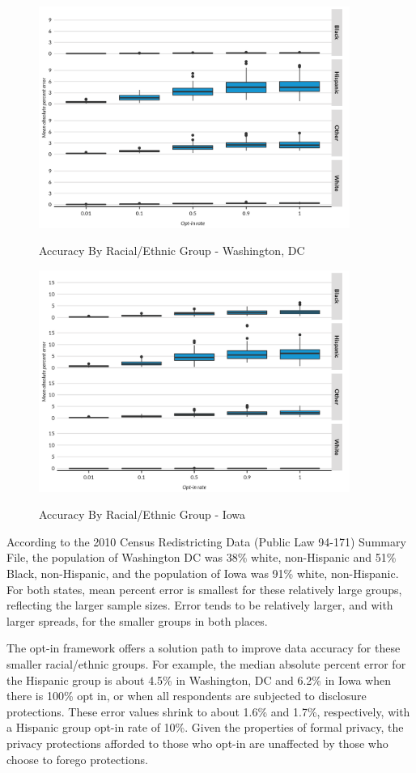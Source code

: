 \documentclass[
]{urban-formatting}
\begin{document}
\begin{figure}[!htb]
    \centering
    \caption{Accuracy By Racial/Ethnic Group - Washington, DC}
    \includegraphics[width=4in]{../figures/groups_dc.png}
    \label{fig:groups_dc}
\end{figure}

\begin{figure}[!htb]
    \centering
    \caption{Accuracy By Racial/Ethnic Group - Iowa}
    \includegraphics[width=4in]{../figures/groups_ia.png}
    \label{fig:groups_ia}
\end{figure}

According to the 2010 Census Redistricting Data (Public Law 94-171)
Summary File, the population of Washington DC was 38\% white,
non-Hispanic and 51\% Black, non-Hispanic, and the population of Iowa
was 91\% white, non-Hispanic. For both states, mean percent error is
smallest for these relatively large groups, reflecting the larger sample
sizes. Error tends to be relatively larger, and with larger spreads, for
the smaller groups in both places.

The opt-in framework offers a solution path to improve data accuracy for
these smaller racial/ethnic groups. For example, the median absolute
percent error for the Hispanic group is about 4.5\% in Washington, DC
and 6.2\% in Iowa when there is 100\% opt in, or when all respondents
are subjected to disclosure protections. These error values shrink to
about 1.6\% and 1.7\%, respectively, with a Hispanic group opt-in rate
of 10\%. Given the properties of formal privacy, the privacy protections
afforded to those who opt-in are unaffected by those who choose to
forego protections.
\end{document}
